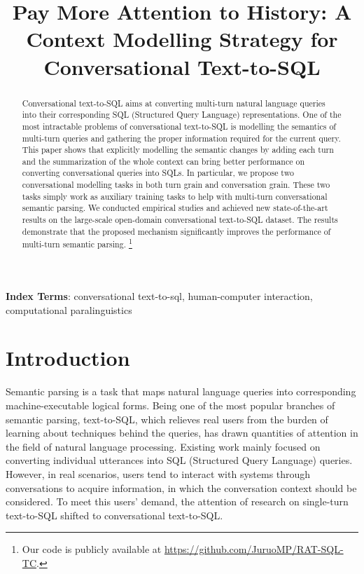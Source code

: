 \documentclass[a4paper]{article}
\title{Pay More Attention to History: A Context Modelling Strategy for Conversational Text-to-SQL}
\begin{document}
\maketitle
\begin{abstract}
Conversational text-to-SQL aims at converting multi-turn natural language queries into their corresponding SQL (Structured Query Language) representations. One of the most intractable problems of conversational text-to-SQL is modelling the semantics of multi-turn queries and gathering the proper information required for the current query. This paper shows that explicitly modelling the semantic changes by adding each turn and the summarization of the whole context can bring better performance on converting conversational queries into SQLs. In particular, we propose two conversational modelling tasks in both turn grain and conversation grain. These two tasks simply work as auxiliary training tasks to help with multi-turn conversational semantic parsing. We conducted empirical studies and achieved new state-of-the-art results on the large-scale open-domain conversational text-to-SQL dataset. The results demonstrate that the proposed mechanism significantly improves the performance of multi-turn semantic parsing. \footnote{Our code is publicly available at \href{https://github.com/JuruoMP/RAT-SQL-TC}{https://github.com/JuruoMP/RAT-SQL-TC}.}
\end{abstract}
\noindent\textbf{Index Terms}: conversational text-to-sql, human-computer interaction, computational paralinguistics

\section{Introduction}

Semantic parsing is a task that maps natural language queries into corresponding machine-executable logical forms. Being one of the most popular branches of semantic parsing, text-to-SQL, which relieves real users from the burden of learning about techniques behind the queries, has drawn quantities of attention in the field of natural language processing. Existing work mainly focused on converting individual utterances into SQL (Structured Query Language) queries. However, in real scenarios, users tend to interact with systems through conversations to acquire information, in which the conversation context should be considered. To 
meet this users' demand, the attention of research on single-turn text-to-SQL shifted to conversational text-to-SQL. 
\end{document}
